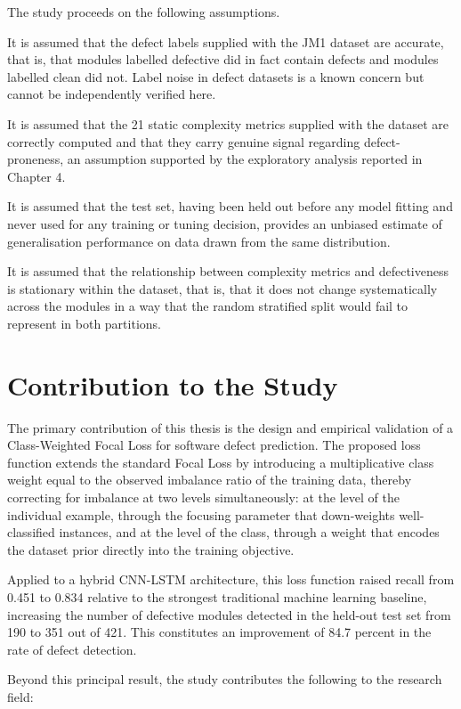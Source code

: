 \documentclass[12pt,a4paper,oneside]{report}
\begin{document}
The study proceeds on the following assumptions.

It is assumed that the defect labels supplied with the JM1 dataset are accurate, that is, that modules labelled defective did in fact contain defects and modules labelled clean did not. Label noise in defect datasets is a known concern but cannot be independently verified here.

It is assumed that the 21 static complexity metrics supplied with the dataset are correctly computed and that they carry genuine signal regarding defect-proneness, an assumption supported by the exploratory analysis reported in Chapter 4.

It is assumed that the test set, having been held out before any model fitting and never used for any training or tuning decision, provides an unbiased estimate of generalisation performance on data drawn from the same distribution.

It is assumed that the relationship between complexity metrics and defectiveness is stationary within the dataset, that is, that it does not change systematically across the modules in a way that the random stratified split would fail to represent in both partitions.

\section{Contribution to the Study}

The primary contribution of this thesis is the design and empirical validation of a Class-Weighted Focal Loss for software defect prediction. The proposed loss function extends the standard Focal Loss by introducing a multiplicative class weight equal to the observed imbalance ratio of the training data, thereby correcting for imbalance at two levels simultaneously: at the level of the individual example, through the focusing parameter that down-weights well-classified instances, and at the level of the class, through a weight that encodes the dataset prior directly into the training objective.

Applied to a hybrid CNN-LSTM architecture, this loss function raised recall from 0.451 to 0.834 relative to the strongest traditional machine learning baseline, increasing the number of defective modules detected in the held-out test set from 190 to 351 out of 421. This constitutes an improvement of 84.7 percent in the rate of defect detection.

Beyond this principal result, the study contributes the following to the research field:
\end{document}
